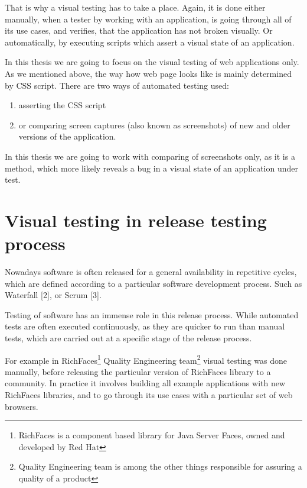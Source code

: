 \documentclass[11pt,oneside,final]{fithesis2}
\begin{document}
    That is why a visual testing has to take a place. Again, it is done either manually, when a tester by working with an application, is going through all of its use cases, and verifies, that
    the application has not broken visually. Or automatically, by executing scripts which assert a visual state of an application.
    
    In this thesis we are going to focus on the visual testing of web applications only. As we mentioned above, the way how web page looks like is mainly determined by CSS script.
    There are two ways of automated testing used:
    \begin{enumerate}
      \item asserting the CSS script
      \item or comparing screen captures (also known as screenshots) of new and older versions of the application.
    \end{enumerate}
    
    In this thesis we are going to work with comparing of screenshots only, as it is a method, which more likely reveals a bug
    in a visual state of an application under test.
     
  \section{Visual testing in release testing process}
  \label{sec:visual-testing-in-release-process}
  Nowadays software is often released for a general availability in repetitive cycles, which are defined according to a particular software development process. 
  Such as Waterfall [2], or Scrum [3].
  
  Testing of software has an immense role in this release process. While automated tests are often executed continuously, as they are quicker to run than manual tests, 
  which are carried out at a specific stage of the release process.
  
  For example in RichFaces\footnote{RichFaces is a component based library for Java Server Faces, owned and developed by Red Hat} Quality Engineering 
  team\footnote{Quality Engineering team is among the other things responsible for assuring a quality of a product} visual testing was done manually, before releasing 
  the particular version of RichFaces library to a community. In practice it involves building all example applications with new RichFaces libraries, and to go 
  through its use cases with a particular set of web browsers. 
  
\end{document}
